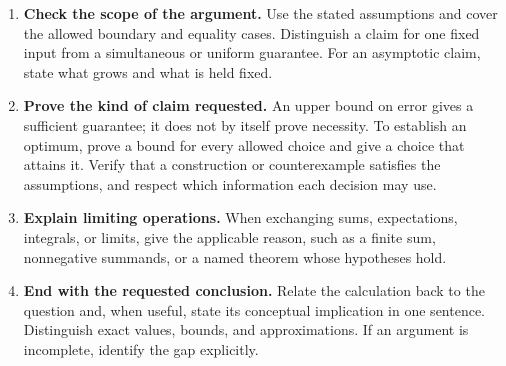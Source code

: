 \begin{enumerate}[leftmargin=*]
Avoid prose placeholders such as ``some index violates the bound.''
For example, define $E_h=\{Z_h>t\}$ for $h\in[H]$ before writing
$\mathbb P(\bigcup_{h=1}^H E_h)\le\sum_{h=1}^H\mathbb P(E_h)$.
Display the set inclusions or other implications used in the argument.
\item \textbf{Check the scope of the argument.} Use the stated assumptions
and cover the allowed boundary and equality cases. Distinguish a claim for
one fixed input from a simultaneous or uniform guarantee. For an asymptotic
claim, state what grows and what is held fixed.
\item \textbf{Prove the kind of claim requested.} An upper bound on error gives a
sufficient guarantee; it does not by itself prove necessity. To establish
an optimum, prove a bound for every allowed choice and give a choice that
attains it. Verify that a construction or counterexample satisfies the
assumptions, and respect which information each decision may use.
\item \textbf{Explain limiting operations.} When exchanging sums,
expectations, integrals, or limits, give the applicable reason, such as a
finite sum, nonnegative summands, or a named theorem whose hypotheses hold.
\item \textbf{End with the requested conclusion.} Relate the calculation
back to the question and, when useful, state its conceptual implication in
one sentence. Distinguish exact values, bounds, and approximations. If an
argument is incomplete, identify the gap explicitly.
\end{enumerate}
